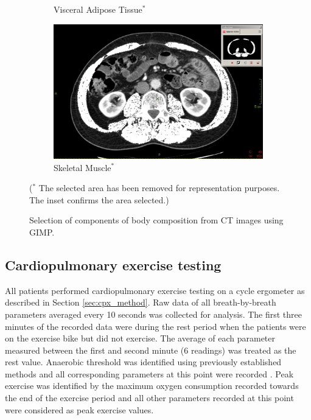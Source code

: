 \begin{figure}[htbp]
\begin{subfigure}{0.45\textwidth}
		\caption{Visceral Adipose Tissue$^*$}
		\label{fig:bc_ct_vat}
	\end{subfigure}
	\begin{subfigure}{0.45\textwidth}
		\centering
		\includegraphics[width=\textwidth]{Figures/bc_ct_sm}
		\caption{Skeletal Muscle$^*$}
		\label{fig:bc_ct_sm}
	\end{subfigure}
	
	\caption{Selection of components of body composition from CT images using GIMP.}($^*$ The selected area has been removed for representation purposes. The inset confirms the area selected.)
	\label{fig:bc_ct_gimp}
	
\end{figure}

\subsection{Cardiopulmonary exercise testing}
All patients performed cardiopulmonary exercise testing on a cycle ergometer as described in Section \ref{sec:cpx_method}. Raw data of all breath-by-breath parameters averaged every 10 seconds was collected for analysis. The first three minutes of the recorded data were during the rest period when the patients were on the exercise bike but did not exercise. The average of each parameter measured between the first and second minute (6 readings) was treated as the rest value. Anaerobic threshold was identified using previously established methods and all corresponding parameters at this point were recorded \parencite{beaver_new_1986,sue_metabolic_1988}. Peak exercise was identified by the maximum oxygen consumption recorded towards the end of the exercise period and all other parameters recorded at this point were considered as peak exercise values. 

